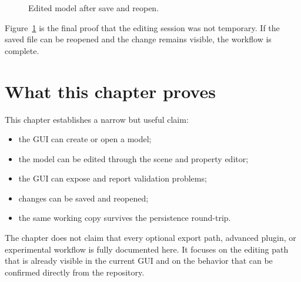 \begin{figure}[htbp]
\centering
\caption{Edited model after save and reopen.}
\label{fig:model-editing-save-reopen}
\end{figure}

Figure~\ref{fig:model-editing-save-reopen} is the final proof that the editing session was not temporary.
If the saved file can be reopened and the change remains visible, the workflow is complete.

\section{What this chapter proves}
\label{sec:model-editing-what-it-proves}

This chapter establishes a narrow but useful claim:
\begin{itemize}
\item the GUI can create or open a model;
\item the model can be edited through the scene and property editor;
\item the GUI can expose and report validation problems;
\item changes can be saved and reopened;
\item the same working copy survives the persistence round-trip.
\end{itemize}

The chapter does not claim that every optional export path, advanced plugin, or experimental workflow is
fully documented here. It focuses on the editing path that is already visible in the current GUI and on
the behavior that can be confirmed directly from the repository.

